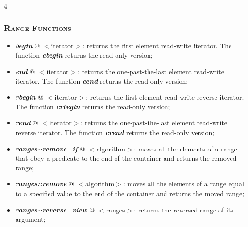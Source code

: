 \documentclass[10pt]{article}
\begin{document}
\begin{multicols*}{4}
{\subsubsection*{\textsc{Range Functions}} 
\begin{itemize}[leftmargin=*,topsep=0.25pt]
  \setlength\itemsep{-1.8pt}
	\item  \emph{\textbf{begin}} @ $<$iterator$>$: returns the first element read-write iterator. The function \emph{\textbf{cbegin}} returns the read-only version;
	\item  \emph{\textbf{end}} @ $<$iterator$>$: returns the one-past-the-last element read-write iterator. The function \emph{\textbf{cend}} returns the read-only version;
	\item  \emph{\textbf{rbegin}} @ $<$iterator$>$: returns the first element read-write reverse iterator. The function \emph{\textbf{crbegin}} returns the read-only version;
 	\item  \emph{\textbf{rend}} @ $<$iterator$>$: returns the one-past-the-last element read-write reverse iterator. The function \emph{\textbf{crend}} returns the read-only version;
	\item  \emph{\textbf{ranges::remove\_if}} @ $<$algorithm$>$: moves all the elements of a range that obey a predicate to the end of the container and returns the removed range; 
	\item  \emph{\textbf{ranges::remove}} @ $<$algorithm$>$: moves all the elements of a range equal to a specified value to the end of the container and returns the moved range;
	\item  \emph{\textbf{ranges::reverse\_view}} @ $<$ranges$>$: returns the reversed range of its argument;

\end{itemize}

}
\end{multicols*}
\end{document}
